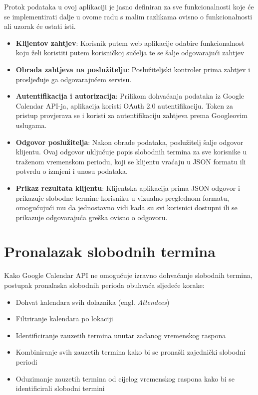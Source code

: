 \documentclass{foi}
\begin{document}
Protok podataka u ovoj aplikaciji je jasno definiran za sve funkcionalnosti koje će se implementirati dalje u ovome radu s malim razlikama ovisno o funkcionalnosti ali uzorak će ostati isti.
\begin{itemize}
    \item \textbf{Klijentov zahtjev}: Korisnik putem web aplikacije odabire funkcionalnost koju želi koristiti putem korisničkoj sučelja te se šalje odgovarajući zahtjev
    \item \textbf{Obrada zahtjeva na poslužitelju}: Poslužiteljski kontroler prima zahtjev i prosljeđuje ga odgovarajućem servisu.
    \item \textbf{Autentifikacija i autorizacija}: Prilikom dohvaćanja podataka iz Google Calendar API-ja, aplikacija koristi OAuth 2.0 autentifikaciju. Token za pristup provjerava se i koristi za autentifikaciju zahtjeva prema Googleovim uslugama.
    \item \textbf{Odgovor poslužitelja}: Nakon obrade podataka, poslužitelj šalje odgovor klijentu. Ovaj odgovor uključuje popis slobodnih termina za sve korisnike u traženom vremenskom periodu, koji se klijentu vraćaju u JSON formatu ili potvrdu o izmjeni i unosu podataka.
    \item \textbf{Prikaz rezultata klijentu}: Klijentska aplikacija prima JSON odgovor i prikazuje slobodne termine korisniku u vizualno preglednom formatu, omogućujući mu da jednostavno vidi kada su svi korisnici dostupni ili se prikazuje odgovarajuća greška ovisno o odgovoru.
\end{itemize}

\section{Pronalazak slobodnih termina}
Kako Google Calendar API ne omogućuje izravno dohvaćanje slobodnih termina, postupak pronalaska slobodnih perioda obuhvaća sljedeće korake:
\begin{itemize}
    \item Dohvat kalendara svih dolaznika (engl. \textit{Attendees})
    \item Filtriranje kalendara po lokaciji
    \item Identificiranje zauzetih termina unutar zadanog vremenskog raspona
    \item Kombiniranje svih zauzetih termina kako bi se pronašli zajednički slobodni periodi
    \item Oduzimanje zauzetih termina od cijelog vremenskog raspona kako bi se identificirali slobodni termini
\end{itemize}
\end{document}
